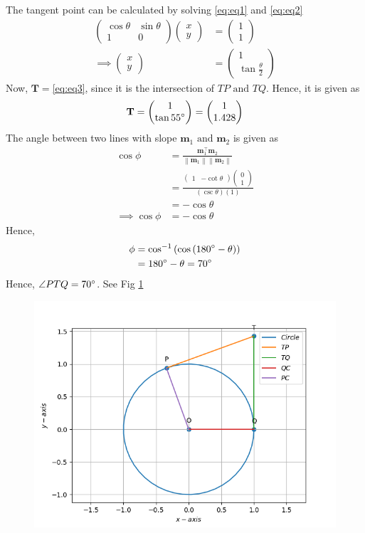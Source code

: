 \documentclass[12pt]{article}
\providecommand{\brak}[1]{\ensuremath{\left(#1\right)}}
\providecommand{\norm}[1]{\left\lVert#1\right\rVert}
\newcommand{\myvec}[1]{\ensuremath{\begin{pmatrix}#1\end{pmatrix}}}
\let\vec\mathbf
\begin{document}
The tangent point can be calculated by solving \eqref{eq:eq1} and \eqref{eq:eq2}
\begin{align}
	\myvec{\cos\theta&\sin\theta\\1&0}\myvec{x\\y} &= \myvec{1\\1}\\
	\label{eq:eq3}
	\implies \myvec{x\\y} &= \myvec{1\\\tan{\frac{\theta}{2}}}
\end{align}
Now, $\vec{T}=$\eqref{eq:eq3}, since it is the intersection of $TP \text{ and } TQ$. Hence, it is given as
\begin{align}
	\vec{T} = \myvec{1\\\tan{55}\degree} = \myvec{1\\1.428}	
\end{align}
The angle between two lines with slope $\vec{m}_1 \text{ and } \vec{m}_2$ is given as
\begin{align}
	\cos\phi &= \frac{\vec{m}_1^\top\vec{m}_2}{\norm{\vec{m}_1}\norm{\vec{m}_2}}\\
	&= \frac{\myvec{1&-\cot\theta}\myvec{0\\1}}{\brak{\csc\theta}\brak{1}}\\
	&= -\cos\theta\\
	\implies \cos\phi &= -\cos\theta
\end{align}
Hence,
\begin{align}
	\phi &= \cos^{-1}\brak{\cos{\brak{180\degree-\theta}}}\\
	     &= 180\degree-\theta = 70\degree
\end{align}
Hence, $\angle{PTQ} = 70\degree$. See Fig \ref{fig:Fig1}
\begin{figure}[!h]
	\begin{center} 
	    \includegraphics[width=\columnwidth]{figs/tangent2}
	\end{center}
\caption{}
\label{fig:Fig1}
\end{figure}
\end{document}

